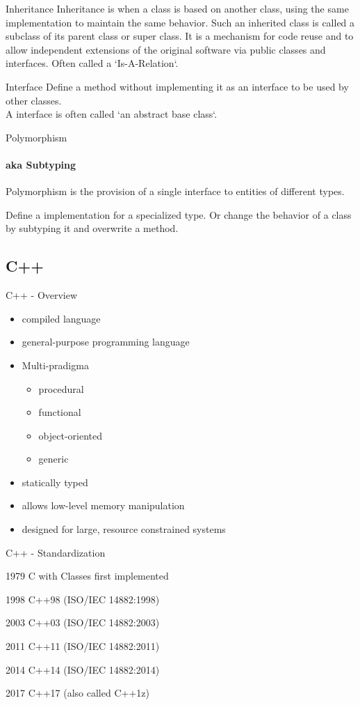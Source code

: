 \documentclass{beamer}
\begin{document}
\begin{frame}{Inheritance}
Inheritance is when a class is based on another class, using the same
implementation to maintain the same behavior.
Such an inherited class is called a subclass of its parent class or super class.
It is a mechanism for code reuse and to allow independent extensions of the
original software via public classes and interfaces.
 Often called a `Is-A-Relation`.
\end{frame}

\begin{frame}{Interface}
Define a method without implementing it as an interface to be used by other
classes. \\
A interface is often called `an abstract base class`.
\end{frame}

\begin{frame}{Polymorphism}
\framesubtitle{aka Subtyping}
Polymorphism is the provision of a single interface to entities of different
types.

Define a implementation for a specialized type. Or change the behavior of a
class by subtyping it and overwrite a method.
\end{frame}

\subsection{C++}
\begin{frame}{C++ - Overview}
\begin{itemize}
  \item compiled language
  \item general-purpose programming language
  \item Multi-pradigma
  \begin{itemize}
    \item procedural
    \item functional
    \item object-oriented
    \item generic
  \end{itemize}
  \item statically typed
  \item allows low-level memory manipulation
  \item designed for large, resource constrained systems 
\end{itemize}
\end{frame}


\begin{frame}{C++ - Standardization}
\itemize{}
\item[1979] C with Classes first implemented 
\item[1998] C++98 (ISO/IEC 14882:1998)
\item[2003] C++03 (ISO/IEC 14882:2003)
\item[2011] C++11 (ISO/IEC 14882:2011)
\item[2014] C++14 (ISO/IEC 14882:2014)
\item[2017] C++17 (also called C++1z)
\end{frame}
\end{document}
